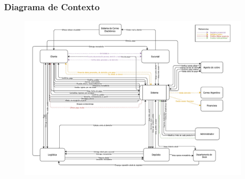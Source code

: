 \subsubsection{Diagrama de Contexto}

\begin{figure}[H]
  \begin{center}
  \includegraphics[height=0.65\textheight,angle=90]{images/contexto.pdf}
  \end{center}
\end{figure}
